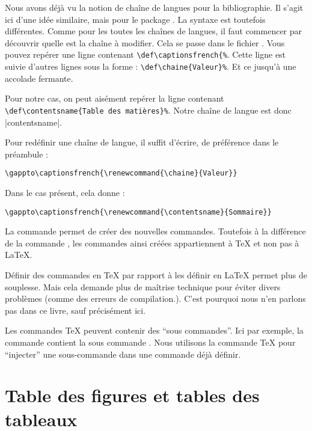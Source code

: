 Nous avons déjà vu la notion de chaîne de langues pour la bibliographie. Il s'agit ici  d'une idée similaire, mais pour le package . La syntaxe est toutefois différentes. Comme pour les toutes les chaînes de langues, il faut commencer par découvrir quelle est la chaîne à modifier. Cela se passe dans le fichier . Vous pouvez repérer une ligne contenant \verb|\def\captionsfrench{%|. 
Cette ligne est suivie d'autres lignes sous la forme : \verb|\def\chaine{Valeur}%|. Et ce jusqu'à une accolade fermante.

Pour notre cas, on peut aisément repérer la ligne contenant \verb|\def\contentsname{Table des matières}%|.
Notre chaîne de langue est donc \forme|contentsname|.

Pour  redéfinir une chaîne de langue, il suffit d'écrire, de préférence dans le préambule :

\begin{verbatim}
\gappto\captionsfrench{\renewcommand{\chaine}{Valeur}}
\end{verbatim}

Dans le cas présent, cela donne :

\begin{verbatim}
\gappto\captionsfrench{\renewcommand{\contentsname}{Sommaire}}
\end{verbatim}



\begin{anedocte}
La commande  permet de créer des nouvelles commandes. Toutefois à la différence de la commande , les commandes ainsi créées appartiennent à \TeX{} et non pas à \LaTeX{}.

Définir des commandes en \TeX{} par rapport à les définir en \LaTeX{} permet plus de souplesse. Mais cela demande plus de maîtrise technique pour éviter divers problèmes (comme des erreurs de compilation.). C'est pourquoi nous n'en parlons pas dans ce livre, sauf précisément ici.

Les commandes \TeX{} peuvent contenir des \enquote{sous commandes}. Ici par exemple, la commande  contient la sous commande . Nous utilisons la commande \TeX{}  pour \enquote{injecter} une sous-commande dans une commande déjà définir.
\end{anedocte}

\section{Table des figures et tables des tableaux}\label{tablefigure}

